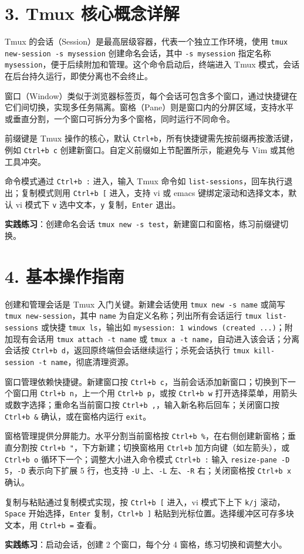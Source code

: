 \chapter{3. Tmux 核心概念详解}
Tmux 的会话（Session）是最高层级容器，代表一个独立工作环境，使用 \texttt{tmux new-session -s mysession} 创建命名会话，其中 \texttt{-s mysession} 指定名称 \texttt{mysession}，便于后续附加和管理。这个命令启动后，终端进入 Tmux 模式，会话在后台持久运行，即使分离也不会终止。\par
窗口（Window）类似于浏览器标签页，每个会话可包含多个窗口，通过快捷键在它们间切换，实现多任务隔离。窗格（Pane）则是窗口内的分屏区域，支持水平或垂直分割，一个窗口可拆分为多个窗格，同时运行不同命令。\par
前缀键是 Tmux 操作的核心，默认 \texttt{Ctrl+b}，所有快捷键需先按前缀再按激活键，例如 \texttt{Ctrl+b c} 创建新窗口。自定义前缀如上节配置所示，能避免与 Vim 或其他工具冲突。\par
命令模式通过 \texttt{Ctrl+b :} 进入，输入 Tmux 命令如 \texttt{list-sessions}，回车执行退出；复制模式则用 \texttt{Ctrl+b [} 进入，支持 vi 或 emacs 键绑定滚动和选择文本，默认 vi 模式下 \texttt{v} 选中文本，\texttt{y} 复制，\texttt{Enter} 退出。\par
\textbf{实践练习}：创建命名会话 \texttt{tmux new -s test}，新建窗口和窗格，练习前缀键切换。\par
\chapter{4. 基本操作指南}
创建和管理会话是 Tmux 入门关键。新建会话使用 \texttt{tmux new -s name} 或简写 \texttt{tmux new-session}，其中 \texttt{name} 为自定义名称；列出所有会话运行 \texttt{tmux list-sessions} 或快捷 \texttt{tmux ls}，输出如 \texttt{mysession: 1 windows (created ...)}；附加现有会话用 \texttt{tmux attach -t name} 或 \texttt{tmux a -t name}，自动进入该会话；分离会话按 \texttt{Ctrl+b d}，返回原终端但会话继续运行；杀死会话执行 \texttt{tmux kill-session -t name}，彻底清理资源。\par
窗口管理依赖快捷键。新建窗口按 \texttt{Ctrl+b c}，当前会话添加新窗口；切换到下一个窗口用 \texttt{Ctrl+b n}，上一个用 \texttt{Ctrl+b p}，或按 \texttt{Ctrl+b w} 打开选择菜单，用箭头或数字选择；重命名当前窗口按 \texttt{Ctrl+b ,}，输入新名称后回车；关闭窗口按 \texttt{Ctrl+b \&{}} 确认，或在窗格内运行 \texttt{exit}。\par
窗格管理提供分屏能力。水平分割当前窗格按 \texttt{Ctrl+b \%{}}，在右侧创建新窗格；垂直分割按 \texttt{Ctrl+b "}，下方新建；切换窗格用 \texttt{Ctrl+b} 加方向键（如左箭头），或 \texttt{Ctrl+b o} 循环下一个；调整大小进入命令模式 \texttt{Ctrl+b :} 输入 \texttt{resize-pane -D 5}，\texttt{-D} 表示向下扩展 5 行，也支持 \texttt{-U} 上、\texttt{-L} 左、\texttt{-R} 右；关闭窗格按 \texttt{Ctrl+b x} 确认。\par
复制与粘贴通过复制模式实现，按 \texttt{Ctrl+b [} 进入，vi 模式下上下 \texttt{k/j} 滚动，\texttt{Space} 开始选择，\texttt{Enter} 复制，\texttt{Ctrl+b ]} 粘贴到光标位置。选择缓冲区可存多块文本，用 \texttt{Ctrl+b =} 查看。\par
\textbf{实践练习}：启动会话，创建 2 个窗口，每个分 4 窗格，练习切换和调整大小。\par
